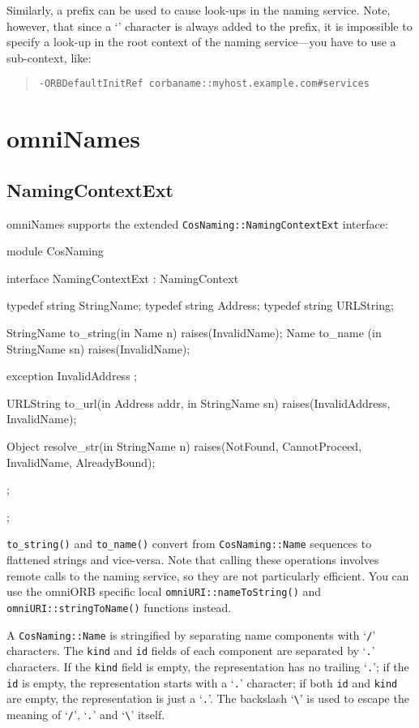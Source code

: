 \documentclass[11pt,twoside,a4paper]{book}
\newcommand{\type}[1]{\texttt{#1}}
\newcommand{\intf}[1]{\texttt{#1}}
\newcommand{\code}[1]{\texttt{#1}}
\newcommand{\op}[1]{\texttt{#1()}}
\newcommand{\cmdline}[1]{\texttt{#1}}
\newcommand{\corbauri}{\begingroup \urlstyle{tt}\Url}
\newcommand{\dsc}{\discretionary{}{}{}}
\begin{document}
Similarly, a \corbauri{corbaname} prefix can be used to cause
look-ups in the naming service. Note, however, that since a
`\corbauri{/}' character is always added to the prefix, it is
impossible to specify a look-up in the root context of the naming
service---you have to use a sub-context, like:

\begin{quote}
\cmdline{-ORBDefaultInitRef corbaname::myhost.example.com\#services}
\end{quote}



\section{omniNames}

\subsection{NamingContextExt}

omniNames supports the extended \intf{CosNaming::NamingContextExt}
interface:

\begin{idllisting}
module CosNaming {
  interface NamingContextExt : NamingContext {
    typedef string StringName;
    typedef string Address;
    typedef string URLString;

    StringName  to_string(in Name n)        raises(InvalidName);
    Name        to_name  (in StringName sn) raises(InvalidName);

    exception InvalidAddress {};

    URLString   to_url(in Address addr, in StringName sn)
      raises(InvalidAddress, InvalidName);

    Object      resolve_str(in StringName n)
      raises(NotFound, CannotProceed, InvalidName, AlreadyBound);
  };
};
\end{idllisting}

\op{to\_string} and \op{to\_name} convert from \type{CosNaming::Name}
sequences to flattened strings and vice-versa.  Note that calling
these operations involves remote calls to the naming service, so they
are not particularly efficient. You can use the omniORB specific local
\op{omniURI::nameToString} and \op{omniURI::\dsc{}stringToName}
functions instead.

A \type{CosNaming::Name} is stringified by separating name components
with `\texttt{/}' characters. The \code{kind} and \code{id} fields of
each component are separated by `\texttt{.}' characters. If the
\code{kind} field is empty, the representation has no trailing
`\texttt{.}'; if the \code{id} is empty, the representation starts
with a `\texttt{.}' character; if both \texttt{id} and \texttt{kind}
are empty, the representation is just a `\texttt{.}'. The backslash
`\texttt{\textbackslash}' is used to escape the meaning of
`\texttt{/}', `\texttt{.}' and `\texttt{\textbackslash}' itself.
\end{document}
